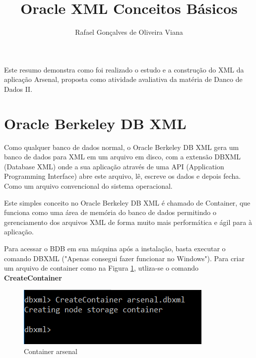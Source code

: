 \documentclass[12pt]{article}
\title{Oracle XML  Conceitos Básicos}
\author{Rafael Gonçalves de Oliveira Viana\inst{1} }
\begin{document}
 

\maketitle


     
\begin{resumo} 
  Este resumo demonstra como foi realizado o estudo e a construção do XML da aplicação Arsenal, proposta como atividade avaliativa da matéria de Danco de Dados II.
  
  
\end{resumo}


\section{Oracle Berkeley DB XML}

Como qualquer banco de dados normal, o Oracle Berkeley DB XML gera um banco de dados para XML em um arquivo em disco, com a extensão DBXML (Database XML) onde a sua aplicação através de uma API (Application Programming Interface) abre este arquivo, lê, escreve os dados e depois fecha. Como um arquivo convencional do sistema operacional.

Este simples conceito no Oracle Berkeley DB XML é chamado de Container, que funciona como uma área de memória  do banco de dados permitindo o gerenciamento dos arquivos XML de forma muito mais performática e ágil para à aplicação.\cite{dbxml}

Para acessar o BDB em sua máquina após a instalação, basta executar o comando DBXML ("Apenas consegui fazer funcionar no Windows"). Para criar um arquivo de container como na Figura \ref{fg1}, utliza-se o comando \textbf{CreateContainer}

	\begin{figure}[!htb]
	\centering
	\includegraphics[scale=0.8]{./imagens/f1.png}
	
	\caption{Container arsenal}
	\label{fg1}
\end{figure}
\end{document}
